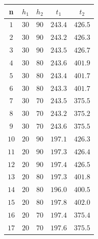 \documentclass[a4paper]{ltxdoc}
\begin{document}
\begin{multicols}{2}
    \bigskip
    \begin{tabular}{|c|c|c|c|c|}
        \hline \textbf{n} & \textbf{$h_1$} & \textbf{$h_2$} & \textbf{$t_1$} & \textbf{$t_2$} \\
        \hline $1$        & $30$           & $90$           & $243.4$         & $426.5$        \\
        \hline $2$        & $30$           & $90$           & $243.2$         & $426.3$        \\
        \hline $3$        & $30$           & $90$           & $243.5$         & $426.7$        \\
        \hline
        \hline $4$        & $30$           & $80$           & $243.6$         & $401.9$        \\
        \hline $5$        & $30$           & $80$           & $243.4$         & $401.7$        \\
        \hline $6$        & $30$           & $80$           & $243.3$         & $401.7$        \\
        \hline
        \hline $7$        & $30$           & $70$           & $243.5$         & $375.5$        \\
        \hline $8$        & $30$           & $70$           & $243.2$         & $375.2$        \\
        \hline $9$        & $30$           & $70$           & $243.6$         & $375.5$        \\
        \hline
        \hline $10$       & $20$           & $90$           & $197.1$         & $426.3$        \\
        \hline $11$       & $20$           & $90$           & $197.3$         & $426.4$        \\
        \hline $12$       & $20$           & $90$           & $197.4$         & $426.5$        \\
        \hline
        \hline $13$       & $20$           & $80$           & $197.3$         & $401.8$        \\
        \hline $14$       & $20$           & $80$           & $196.0$         & $400.5$        \\
        \hline $15$       & $20$           & $80$           & $197.8$         & $402.0$        \\
        \hline
        \hline $16$       & $20$           & $70$           & $197.4$         & $375.4$        \\
        \hline $17$       & $20$           & $70$           & $197.6$         & $375.5$        \\

\end{tabular}
\end{multicols}
\end{document}
